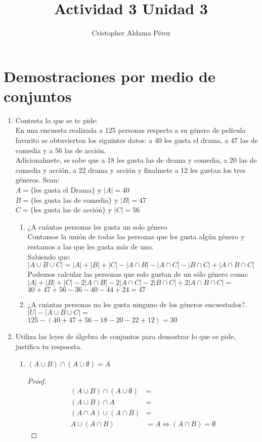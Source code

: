\documentclass[a4paper,10pt]{article}
\title{Actividad 3 Unidad 3}
\author{Cristopher Aldama Pérez}
\begin{document}
\maketitle

\section{Demostraciones por medio de conjuntos}

\begin{enumerate}
 \item Contesta lo que se te pide:
 \\En una encuesta realizada a 125 personas respecto a su género de película favorito se obtuvierton los siguintes datos: a 40 les gusta el drama, a 47 las de comedia y a 56 las de acción.
 \\Adicionalmete, se sabe que a 18 les gusta las de drama y comedia, a 20 las de comedia y acción, a 22 drama y acción y finalmete a 12 les gustan los tres géneros. Sean:
   \\ $A = \{$les gusta el Drama$\}$ y $|A| = 40$
   \\ $B = \{$les gusta las de comedia$\}$ y $|B| = 47$
   \\ $C = \{$les gusta las de acción$\}$ y $|C| = 56$
    
  \begin{enumerate}[label=\alph*]
   \item ¿A cuántas personas les gusta un solo género
   \\ Contamos la unión de todas las personas que les gusta algún género y restamos a las que les gusta más de uno.
   \\Sabiendo que: $|A\cup B\cup C| = |A|+|B|+|C|-|A\cap B|-|A\cap C|-|B\cap C| + |A\cap B\cap C|$
   \\ Podemos calcular las personas que solo gustan de un sólo género como:
   \\ $|A|+|B|+|C|-2|A\cap B|-2|A\cap C|-2|B\cap C| + 2|A\cap B\cap C| =$
   \\ $40 + 47 + 56 - 36 - 40 - 44 + 24 = 47$
   \item ¿A cuántas personas no les gusta ninguno de los géneros encuestados?.
   \\ $|U|-|A\cup B\cup C| =$
   \\ $125-(40+47+56-18-20-22+12)=30$
  \end{enumerate}
\item Utiliza las leyes de álgebra de conjuntos para demostrar lo que se pide, justifica tu respuesta.
\begin{enumerate}[label=\alph*]
 \item $(A\cup B)\cap(A\cup\emptyset)=A$
 \begin{proof}
  \begin{align*}
 (A\cup B)\cap(A\cup\emptyset)&=
 \\(A\cup B)\cap A&=
 \\(A\cap A)\cup(A\cap B)&=
 \\A\cup(A\cap B) &= A \iff (A\cap B)=\emptyset
  \end{align*}
 \end{proof}
 

\end{enumerate}
\end{enumerate}
\end{document}
